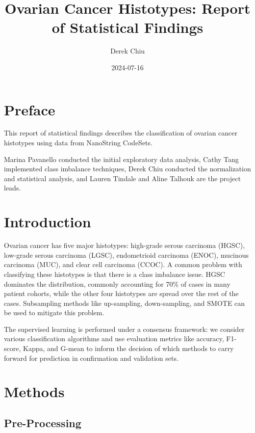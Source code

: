 \documentclass[
]{report}
\title{Ovarian Cancer Histotypes: Report of Statistical Findings}
\author{Derek Chiu}
\date{2024-07-16}
\begin{document}
\maketitle

{
\hypersetup{linkcolor=}
\setcounter{tocdepth}{1}
\tableofcontents
}
\listoffigures
\listoftables
\chapter*{Preface}\label{preface}

This report of statistical findings describes the classification of ovarian cancer histotypes using data from NanoString CodeSets.

Marina Pavanello conducted the initial exploratory data analysis, Cathy Tang implemented class imbalance techniques, Derek Chiu conducted the normalization and statistical analysis, and Lauren Tindale and Aline Talhouk are the project leads.

\chapter{Introduction}\label{introduction}

Ovarian cancer has five major histotypes: high-grade serous carcinoma (HGSC), low-grade serous carcinoma (LGSC), endometrioid carcinoma (ENOC), mucinous carcinoma (MUC), and clear cell carcinoma (CCOC). A common problem with classifying these histotypes is that there is a class imbalance issue. HGSC dominates the distribution, commonly accounting for 70\% of cases in many patient cohorts, while the other four histotypes are spread over the rest of the cases. Subsampling methods like up-sampling, down-sampling, and SMOTE can be used to mitigate this problem.

The supervised learning is performed under a consensus framework: we consider various classification algorithms and use evaluation metrics like accuracy, F1-score, Kappa, and G-mean to inform the decision of which methods to carry forward for prediction in confirmation and validation sets.

\chapter{Methods}\label{methods}

\section{Pre-Processing}\label{pre-processing}
\end{document}
